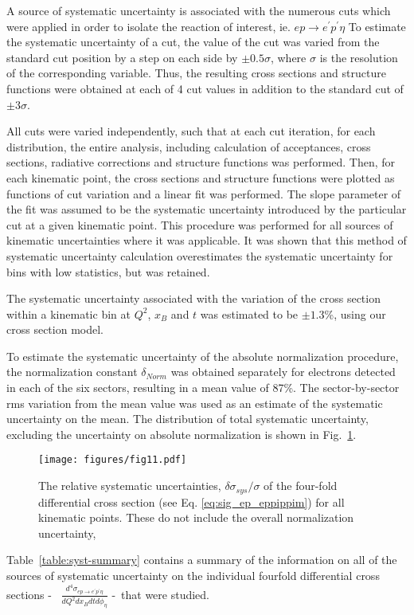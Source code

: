 \documentclass[prc,aps,floatfix,showpacs,showkeys,twocolumn,superscriptaddress,letterpaper,10pt]{revtex4-1}
\begin{document}
A source of systematic uncertainty is associated with the numerous cuts which were applied in order to isolate the reaction of interest, ie. $e p \to  e^\prime p^\prime \eta$  
To estimate the systematic uncertainty of a cut, the value of the cut was
varied from the standard cut position by a  step on each side by $\pm0.5\sigma$,
where $\sigma$ is the resolution of the corresponding variable. Thus, the resulting  cross sections and structure functions  were obtained at each of 4 cut values in addition to the standard cut of $\pm3\sigma$.

All cuts were varied independently,  such that at each cut iteration, for each distribution, the entire  analysis, including calculation of acceptances, cross sections, radiative corrections and structure functions was performed. Then, for each kinematic point, the  cross sections and structure functions were plotted as functions of cut variation and a linear fit was
performed. The slope parameter of the fit was assumed to be the systematic
uncertainty introduced by the particular cut at a given kinematic point. This procedure was
performed for  all  sources of kinematic uncertainties where it was applicable.
It was shown that this method of systematic uncertainty calculation
overestimates  the systematic uncertainty for bins with low statistics, but was retained.


The systematic uncertainty   associated with the variation of  the cross section within a kinematic  bin  at $Q^2$, $x_B$ and  $t$  
was estimated to be $\pm 1.3$\%,
using our cross section model. 

To estimate the systematic uncertainty of the absolute normalization procedure, the normalization constant $\delta_{Norm}$ was obtained separately for electrons detected in each of the six sectors, resulting in a mean value of 87\%.  The sector-by-sector rms variation from the mean value  was used as an estimate of the systematic uncertainty on the mean. 
The distribution of total systematic uncertainty, excluding the uncertainty on absolute normalization is shown in  Fig.~\ref{fig:syst-tot}.
\begin{figure}
\begin{centering} 
\texttt{[image: figures/fig11.pdf]}  
\caption{\label{fig:syst-tot} 
The relative systematic  uncertainties, $\delta\sigma_{sys}/\sigma$ of the four-fold differential cross section (see Eq. \ref{eq:sig_ep_eppippim}) for all kinematic points. These do not  include the overall normalization uncertainty, 
}
\end{centering} 
\end{figure}
Table~\ref{table:syst-summary} contains a summary of the information on all of the sources of systematic uncertainty on the individual fourfold differential cross sections - \ $ \frac{d^4 \sigma_{ep \rightarrow e^\prime p^\prime \eta}}{dQ^2 dx_B dt d\phi_\eta}$ -\  that were
studied. 
\end{document}
